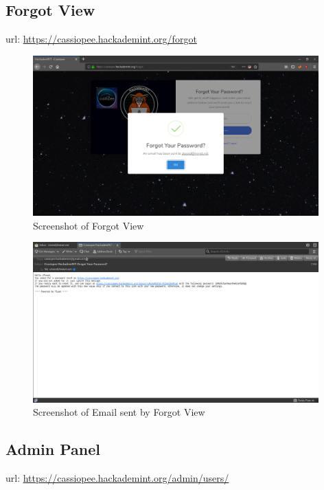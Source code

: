 \subsection{Forgot View}
url: \url{https://cassiopee.hackademint.org/forgot}

\begin{figure}[!h]
  \centering
  \includegraphics[width=0.98\textwidth]{images/flask-application-02.png}
  \caption{Screenshot of Forgot View}
  \label{ForgotView}
\end{figure}

\pagebreak

\begin{figure}[!h]
  \centering
  \includegraphics[width=0.98\textwidth]{images/flask-application-021.png}
  \caption{Screenshot of Email sent by Forgot View}
  \label{ForgotViewSent}
\end{figure}


\subsection{Admin Panel}
url: \url{https://cassiopee.hackademint.org/admin/users/}

